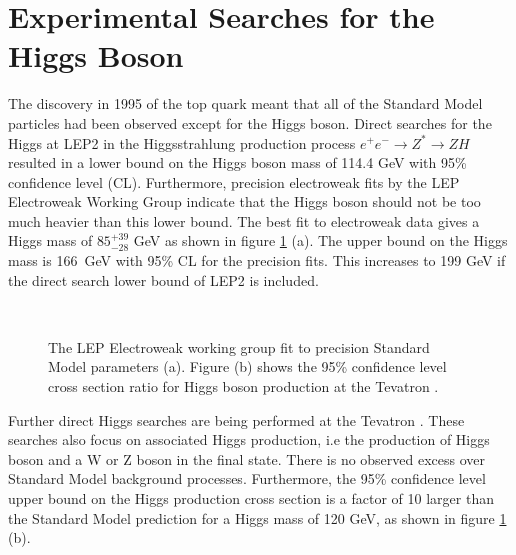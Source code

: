 \section{Experimental Searches for the Higgs Boson} \label{higgssearches}

The discovery in 1995 of the top quark \cite{Abe:1995hr} meant that all of the Standard Model particles had been observed except for the Higgs boson. Direct searches for the Higgs at LEP2 \cite{Barate:2003sz} in the Higgsstrahlung production process $e^+ e^- \rightarrow Z^* \rightarrow Z H$ resulted in a lower bound on the Higgs boson mass of 114.4 GeV with 95\% confidence level (CL). Furthermore, precision electroweak fits by the LEP Electroweak Working Group \cite{unknown:2005di} indicate that the Higgs boson should not be too much heavier than this lower bound. The best fit to electroweak data gives a Higgs mass of $85^{+39}_{-28}$ GeV as shown in figure \ref{electroweakhiggs} (a). The upper bound on the Higgs mass is 166~GeV with 95\% CL for the precision fits. This increases to 199 GeV if the direct search lower bound of LEP2 is included.

\begin{figure} 
\centering
\mbox{
	}
\caption[Experimental bounds for Standard Model Higgs production]{The LEP Electroweak working group fit to precision Standard Model parameters (a). Figure (b) shows the 95\% confidence level cross section ratio for Higgs boson production at the Tevatron \cite{Soldner-Rembold:2006wf}. \label{electroweakhiggs}}
\end{figure}

Further direct Higgs searches are being performed at the Tevatron \cite{Soldner-Rembold:2006wf}. These searches also focus on associated Higgs production, i.e the production of Higgs boson and a W or Z boson in the final state. There is no observed excess over Standard Model background processes. Furthermore, the 95\% confidence level upper bound on the Higgs production cross section is a factor of 10 larger than the Standard Model prediction for a Higgs mass of 120 GeV, as shown in figure \ref{electroweakhiggs} (b). 

